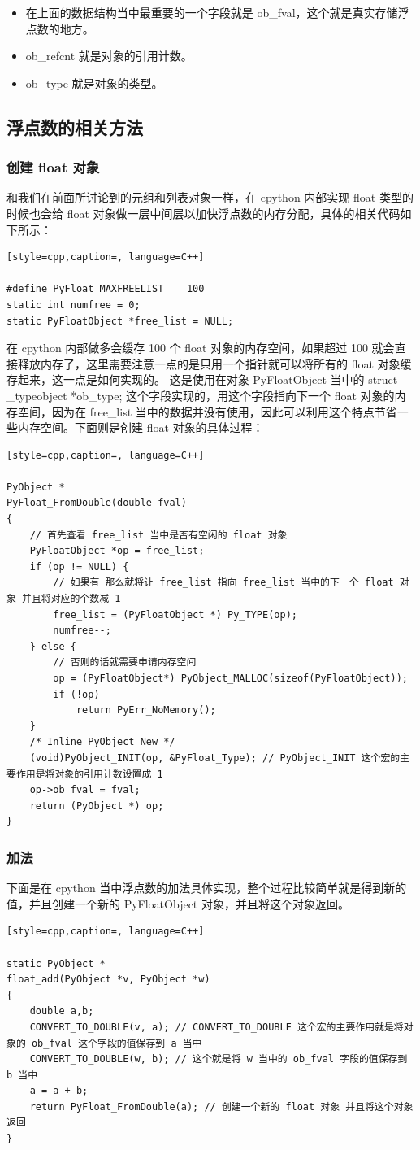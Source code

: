 \begin{itemize}
\item 在上面的数据结构当中最重要的一个字段就是 ob\_fval，这个就是真实存储浮点数的地方。 
\item ob\_refcnt 就是对象的引用计数。 
\item ob\_type 就是对象的类型。 
\end{itemize}
\subsection{浮点数的相关方法}
\subsubsection{创建 float 对象}
和我们在前面所讨论到的元组和列表对象一样，在 cpython 内部实现 float 类型的时候也会给 float 对象做一层中间层以加快浮点数的内存分配，具体的相关代码如下所示：
\begin{lstlisting}[style=cpp,caption=, language=C++]

#define PyFloat_MAXFREELIST    100
static int numfree = 0;
static PyFloatObject *free_list = NULL;
\end{lstlisting}
在 cpython 内部做多会缓存 100 个 float 对象的内存空间，如果超过 100 就会直接释放内存了，这里需要注意一点的是只用一个指针就可以将所有的 float 对象缓存起来，这一点是如何实现的。
这是使用在对象 PyFloatObject 当中的 struct \_typeobject *ob\_type; 这个字段实现的，用这个字段指向下一个 float 对象的内存空间，因为在 free\_list 当中的数据并没有使用，因此可以利用这个特点节省一些内存空间。下面则是创建 float 对象的具体过程：
\begin{lstlisting}[style=cpp,caption=, language=C++]

PyObject *
PyFloat_FromDouble(double fval)
{
    // 首先查看 free_list 当中是否有空闲的 float 对象
    PyFloatObject *op = free_list;
    if (op != NULL) {
        // 如果有 那么就将让 free_list 指向 free_list 当中的下一个 float 对象 并且将对应的个数减 1
        free_list = (PyFloatObject *) Py_TYPE(op);
        numfree--;
    } else {
      	// 否则的话就需要申请内存空间
        op = (PyFloatObject*) PyObject_MALLOC(sizeof(PyFloatObject));
        if (!op)
            return PyErr_NoMemory();
    }
    /* Inline PyObject_New */
    (void)PyObject_INIT(op, &PyFloat_Type); // PyObject_INIT 这个宏的主要作用是将对象的引用计数设置成 1
    op->ob_fval = fval;
    return (PyObject *) op;
}
\end{lstlisting}
\subsubsection{加法}
下面是在 cpython 当中浮点数的加法具体实现，整个过程比较简单就是得到新的值，并且创建一个新的 PyFloatObject 对象，并且将这个对象返回。
\begin{lstlisting}[style=cpp,caption=, language=C++]

static PyObject *
float_add(PyObject *v, PyObject *w)
{
    double a,b;
    CONVERT_TO_DOUBLE(v, a); // CONVERT_TO_DOUBLE 这个宏的主要作用就是将对象的 ob_fval 这个字段的值保存到 a 当中
    CONVERT_TO_DOUBLE(w, b); // 这个就是将 w 当中的 ob_fval 字段的值保存到 b 当中
    a = a + b;
    return PyFloat_FromDouble(a); // 创建一个新的 float 对象 并且将这个对象返回
}
\end{lstlisting}

